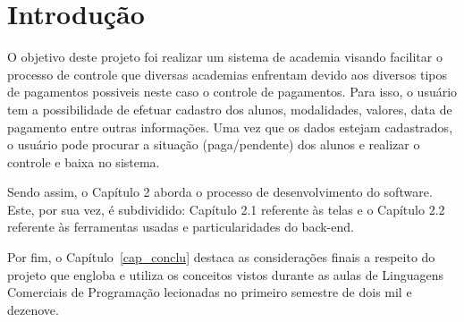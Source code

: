 \chapter{Introdução}\label{cap_intro}

O objetivo deste projeto foi realizar um sistema de academia visando facilitar o processo de controle que diversas academias enfrentam devido aos diversos tipos de pagamentos possiveis neste caso o controle de pagamentos. Para isso, o usuário tem a possibilidade de efetuar cadastro dos alunos, modalidades, valores, data de pagamento entre outras informações. Uma vez que os dados estejam cadastrados, o usuário pode procurar a situação (paga/pendente) dos alunos e realizar o controle e baixa no sistema.

Sendo assim, o Capítulo 2 aborda o processo de desenvolvimento do software. Este, por sua vez, é subdividido: Capítulo 2.1 referente às telas e o Capítulo 2.2 referente às ferramentas usadas e particularidades do back-end.

 Por fim, o Capítulo~\ref{cap_conclu} destaca as considerações finais a respeito do projeto que engloba e utiliza os conceitos vistos durante as aulas de Linguagens Comerciais de Programação lecionadas no primeiro semestre de dois mil e dezenove.
